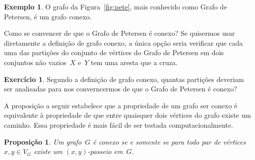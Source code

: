 \documentclass[12pt, a4paper]{article}
\newtheorem{prop}[teor]{Proposição}
\theoremstyle{definition}
\newtheorem{exem}[teor]{Exemplo}
\newtheorem{exer}{Exercício}
\begin{document}
\begin{exem}
O grafo da Figura~\ref{fig:pete}, mais conhecido como Grafo de Petersen, é um grafo conexo. 
\end{exem}

Como se convencer de que o Grafo de Petersen é conexo? Se quisermos usar diretamente a definição de grafo conexo, a única opção seria verificar que cada uma das partições do conjunto de vértices do Grafo de Petersen em dois conjuntos não vazios~$X$ e~$Y$ tem uma aresta que a cruza. 

\begin{exer}
Segundo a definição de grafo conexo, quantas partições deveriam ser analisadas para nos converncermos de que o Grafo de Petersen é conexo?
\end{exer}

A proposição a seguir estabelece que a propriedade de um grafo ser conexo é equivalente à propriedade de que entre quaisquer dois vértices do grafo existe um caminho. Essa propriedade é mais fácil de ser testada computacionalmente.

\begin{prop}
  \label{conex_prop}
  Um grafo~$G$ é conexo se e somente se para todo par de vértices~$x,y \in V_G$ existe um $(x,y)$-passeio em~$G$.
\end{prop}
\end{document}
